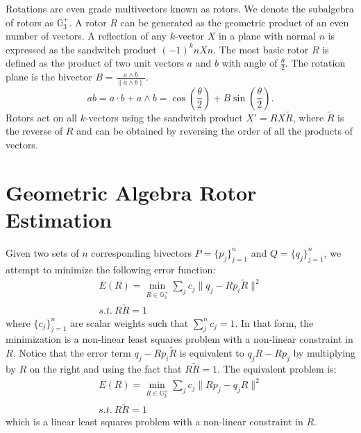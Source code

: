\documentclass{birkjour}
\numberwithin{equation}{section}
\begin{document}
Rotations are even grade multivectors known as rotors. We denote the subalgebra of rotors as $\mathbb{G}^{+}_3$. A rotor $R$ can be generated as the geometric product of an even number of vectors. A reflection of any $k$-vector $X$ in a plane with normal $n$ is expressed as the sandwitch product $(-1)^k n X n$. The most basic rotor $R$ is defined as the product of two unit vectors $a$ and $b$ with angle of $\frac{\theta}{2}$. The rotation plane is the bivector $B = \frac{a \wedge b}{\| a \wedge b \|}$.
\begin{equation*}
a b = a \cdot b + a \wedge b = \cos\left( \frac{\theta}{2} \right) + B \sin\left( \frac{\theta}{2} \right).
\end{equation*}
Rotors act on all $k$-vectors using the sandwitch product $X' = R X \tilde R$, where $\tilde R$ is the reverse of $R$ and can be obtained by reversing the order of all the products of vectors.

\section{Geometric Algebra Rotor Estimation}

Given two sets of $n$ corresponding bivectors $P = \{p_j\}_{j=1}^n$ and $Q = \{q_j\}_{j=1}^n$, we attempt to minimize the following error function:
\begin{eqnarray*}
E(R) = \min_{R \in \mathbb{G}^{+}_3 } \sum_j { c_{j} \|q_j - R p_i \tilde R\|^2 }\\
s.t. \ R \tilde R = 1
\end{eqnarray*}
where $\{c_{j}\}_{j=1}^n$ are scalar weights such that $\sum_j^n{c_j} = 1$. In that form, the minimization is a non-linear least squares problem with a non-linear constraint in $R$. Notice that the error term $q_j - R p_i \tilde R$ is equivalent to $q_j R - R p_j$ by multiplying by $R$ on the right and using the fact that $R \tilde R = 1$. The equivalent problem is:
\begin{eqnarray*}
E(R) = \min_{R \in \mathbb{G}^{+}_3 } \sum_j { c_{j} \|R p_j - q_j R\|^2 }\\
s.t. \ R \tilde R = 1
\end{eqnarray*}
which is a linear least squares problem with a non-linear constraint in $R$.
\end{document}
